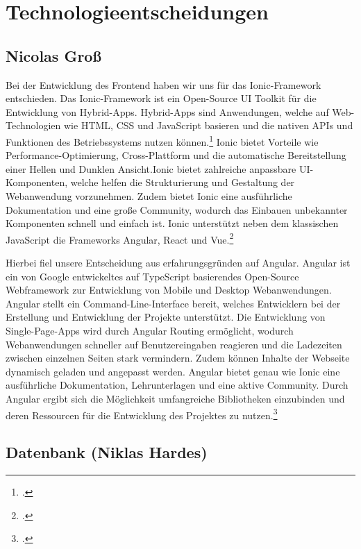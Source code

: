 
\section{Technologieentscheidungen}

\subsection*{Nicolas Groß}

Bei der Entwicklung des Frontend haben wir uns für das Ionic-Framework entschieden. Das Ionic-Framework ist ein Open-Source UI Toolkit für die Entwicklung von Hybrid-Apps. Hybrid-Apps sind Anwendungen, welche auf Web-Technologien wie HTML, CSS und JavaScript basieren und die nativen APIs und Funktionen des Betriebssystems nutzen können.\footcite[.vgl]{HybrideWebApp}  Ionic bietet Vorteile wie Performance-Optimierung, Cross-Plattform und die automatische Bereitstellung einer Hellen und Dunklen Ansicht.Ionic bietet zahlreiche anpassbare UI-Komponenten, welche helfen die Strukturierung und Gestaltung der Webanwendung vorzunehmen. Zudem bietet Ionic eine ausführliche Dokumentation und eine große Community, wodurch das Einbauen unbekannter Komponenten schnell und einfach ist. Ionic unterstützt neben dem klassischen JavaScript die Frameworks Angular, React und Vue.\footcite[.vgl]{Ionic2013}

Hierbei fiel unsere Entscheidung aus erfahrungsgründen auf Angular. Angular ist ein von Google entwickeltes auf TypeScript basierendes Open-Source Webframework zur Entwicklung von Mobile und Desktop Webanwendungen. Angular stellt ein Command-Line-Interface bereit, welches Entwicklern bei der Erstellung und Entwicklung der Projekte unterstützt. Die Entwicklung von Single-Page-Apps wird durch Angular Routing ermöglicht, wodurch Webanwendungen schneller auf Benutzereingaben reagieren und die Ladezeiten zwischen einzelnen Seiten stark vermindern. Zudem können Inhalte der Webseite dynamisch geladen und angepasst werden. Angular bietet genau wie Ionic eine ausführliche Dokumentation, Lehrunterlagen und eine aktive Community. Durch Angular ergibt sich die Möglichkeit umfangreiche Bibliotheken einzubinden und deren Ressourcen für die Entwicklung des Projektes zu nutzen.\footcite[.vgl]{Angular2016}

\newpage
\subsection*{Datenbank (Niklas Hardes)}

